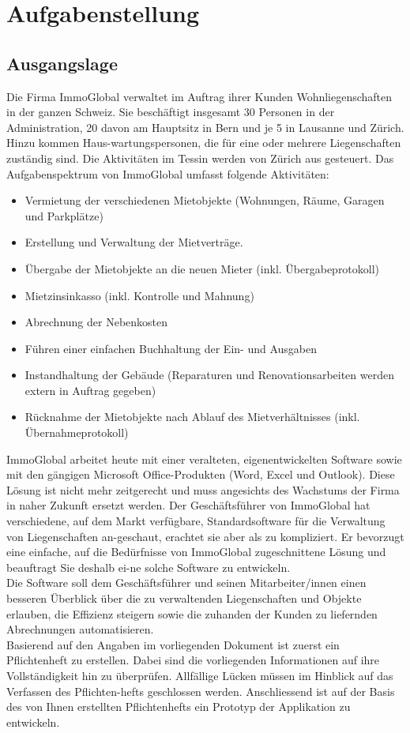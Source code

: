 \section{Aufgabenstellung}
\subsection{Ausgangslage}

Die Firma ImmoGlobal verwaltet im Auftrag ihrer Kunden Wohnliegenschaften in der ganzen Schweiz. Sie beschäftigt insgesamt 30 Personen in der Administration, 20 davon am Hauptsitz in Bern und je 5 in Lausanne und Zürich. Hinzu kommen Haus-wartungspersonen, die für eine oder mehrere Liegenschaften zuständig sind. Die Aktivitäten im Tessin werden von Zürich aus gesteuert.
Das Aufgabenspektrum von ImmoGlobal umfasst folgende Aktivitäten:
\begin{itemize}
    \item Vermietung der verschiedenen Mietobjekte (Wohnungen, Räume, Garagen und Parkplätze)
    \item Erstellung und Verwaltung der Mietverträge.
    \item Übergabe der Mietobjekte an die neuen Mieter (inkl. Übergabeprotokoll)
    \item Mietzinsinkasso (inkl. Kontrolle und Mahnung)
    \item Abrechnung der Nebenkosten
    \item Führen einer einfachen Buchhaltung der Ein- und Ausgaben
    \item Instandhaltung der Gebäude (Reparaturen und Renovationsarbeiten werden extern in Auftrag gegeben)
    \item Rücknahme der Mietobjekte nach Ablauf des Mietverhältnisses (inkl. Übernahmeprotokoll)
\end{itemize}

ImmoGlobal arbeitet heute mit einer veralteten, eigenentwickelten Software sowie mit den gängigen Microsoft Office-Produkten (Word, Excel und Outlook). Diese Lösung ist nicht mehr zeitgerecht und muss angesichts des Wachstums der Firma in naher Zukunft ersetzt werden. Der Geschäftsführer von ImmoGlobal hat verschiedene, auf dem Markt verfügbare, Standardsoftware für die Verwaltung von Liegenschaften an-geschaut, erachtet sie aber als zu kompliziert. Er bevorzugt eine einfache, auf die Bedürfnisse von ImmoGlobal zugeschnittene Lösung und beauftragt Sie deshalb ei-ne solche Software zu entwickeln.\\
Die Software soll dem Geschäftsführer und seinen Mitarbeiter/innen einen besseren Überblick über die zu verwaltenden Liegenschaften und Objekte erlauben, die Effizienz steigern sowie die zuhanden der Kunden zu liefernden Abrechnungen automatisieren.\\
Basierend auf den Angaben im vorliegenden Dokument ist zuerst ein Pflichtenheft zu erstellen. Dabei sind die vorliegenden Informationen auf ihre Vollständigkeit hin zu überprüfen. Allfällige Lücken müssen im Hinblick auf das Verfassen des Pflichten-hefts geschlossen werden. Anschliessend ist auf der Basis des von Ihnen erstellten Pflichtenhefts ein Prototyp der Applikation zu entwickeln.

